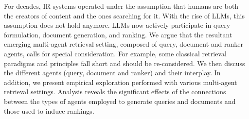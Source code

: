 For decades, IR systems operated under the assumption that humans are
both the creators of content and the ones searching for it.
With the rise of
LLMs, this assumption does not hold anymore.
LLMs now actively participate in query formulation, document
generation, and ranking. We argue that the resultant emerging multi-agent
retrieval setting, composed of query, document and ranker agents,
calls for special consideration. For example, some
classical retrieval paradigms and principles fall short and should be
re-considered. 
We then discuss the different agents (query, document and ranker) and their interplay.
In addition, we
present empirical exploration performed with various multi-agent
retrieval settings. Analysis reveals the significant effects of the connections between the types of agents employed to generate queries and documents and those used to induce rankings.